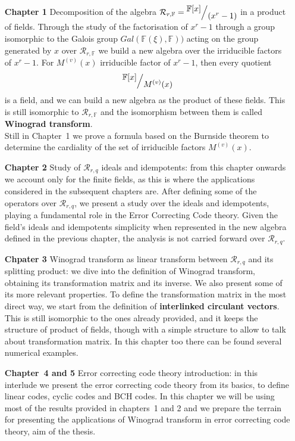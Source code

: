 \begin{enumerate}
   \item[{\bf Chapter 1}] Decomposition of the algebra $\mathcal{R}_{r,\mathbb{F}} = \quotient{ \mathbb{F}[x] }{ (x^r -1 )} $ in a product of fields. Through the study of the factorisation of $x^r -1$ through a group isomorphic to the Galois group $Gal(\mathbb{F}(\xi), \mathbb{F}))$ acting on the group generated by $x$ over $\mathcal{R}_{r,\mathbb{F}} $ we build a new algebra over the irriducible factors of $x^r -1$. For $M^{(v)}(x)$ irriducible factor of $x^r -1$, then every quotient
   \begin{align*}
      \quotient{ \mathbb{F}[x] }{ M^{(v)}(x) }
   \end{align*}
   is a field, and we can build a new algebra as the product of these fields. This is still isomorphic to  $\mathcal{R}_{r,\mathbb{F}}$ and the isomorphism between them is called {\bf Winograd transform}.\\
   Still in Chapter~1 we prove a formula based on the Burnside theorem to determine the cardiality of the set of irriducible factors $M^{(v)}(x)$.

   \item[{\bf Chapter 2}] Study of $\mathcal{R}_{r,q}$ ideals and idempotents: from this chapter onwards we account only for the finite fields, as this is where the applications considered in the subsequent chapters are. After defining some of the operators over $\mathcal{R}_{r,q}$, we present a study over the ideals and idempotents, playing a fundamental role in the Error Correcting Code theory. Given the field's ideals and idempotents simplicity when represented in the new algebra defined in the previous chapter, the analysis is not carried forward over  $\mathcal{R}_{r,q}$.

   \item[{\bf Chpater 3}] Winograd transform as linear transform between $\mathcal{R}_{r,q}$ and its splitting product: we dive into the definition of Winograd transform, obtaining its transformation matrix and its inverse. We also present some of its more relevant properties.
   To define the transformation matrix in the most direct way, we start from the definition of {\bf interlinked circulant vectors}. This is still isomorphic to the ones already provided, and it keeps the structure of product of fields, though with a simple structure to allow to talk about transformation matrix. In this chapter too there can be found several numerical examples.

   \item[{\bf Chapter~4 and 5}]
   Error correcting code theory introduction: in this interlude we present the error correcting code theory from its basics, to define linear codes, cyclic codes and BCH codes. In this chapter we will be using most of the results provided in chapters~1 and 2 and we prepare the terrain for presenting the applications of Winograd transform in error correcting code theory, aim of the thesis.


\end{enumerate}
